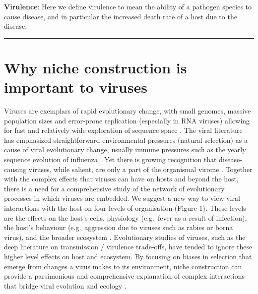 \documentclass[review,draft,12pt]{elsarticle}
\begin{document}
\textbf{Virulence}: Here we define virulence to mean the ability of a
pathogen species to cause disease, and in particular the increased death
rate of a host due to the disease.

\begin{center}\rule{3in}{0.4pt}\end{center}

\section{Why niche construction is important to
viruses}\label{why-niche-construction-is-important-to-viruses}

Viruses are exemplars of rapid evolutionary change, with small genomes,
massive population sizes and error-prone replication (especially in RNA
viruses) allowing for fast and relatively wide exploration of sequence
space \citep{Duffy:2008qy}. The viral literature has emphasized
straightforward environmental pressures (natural selection) as a cause
of viral evolutionary change, usually immune pressures such as the
yearly sequence evolution of influenza \citep[e.g.][]{Watanabe:2012ve}.
Yet there is growing recognition that disease-causing viruses, while
salient, are only a part of the organismal virome \citep{Lecuit:2013jk}.
Together with the complex effects that viruses can have on hosts and
beyond the host, there is a need for a comprehensive study of the
network of evolutionary processes in which viruses are embedded. We
suggest a new way to view viral interactions with the host on four
levels of organisation (Figure 1). These levels are the effects on the
host's cells, physiology (e.g.~fever as a result of infection), the
host's behaviour (e.g.~aggression due to viruses such as rabies or borna
virus), and the broader ecosystem \citep[e.g.~marine viruses affecting
global CO\textsubscript{2};][]{Suttle:2007fv}. Evolutionary studies of
viruses, such as the deep literature on transmission / virulence
trade-offs, have tended to ignore these higher level effects on host and
ecosystem. By focusing on biases in selection that emerge from changes a
virus makes to its environment, niche construction can provide a
parsimonious and comprehensive explanation of complex interactions that
bridge viral evolution and ecology \citep{Matthews2014}.
\end{document}
